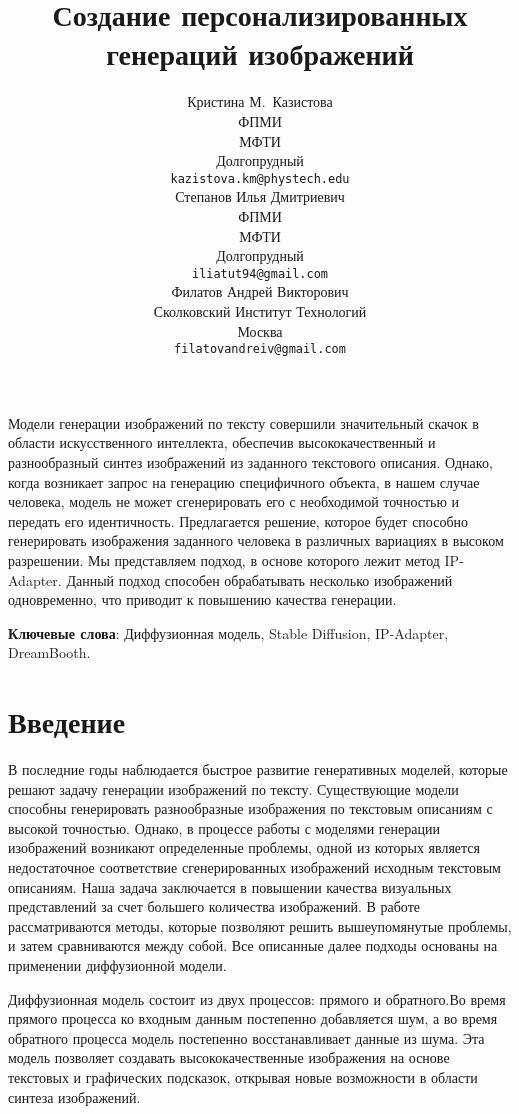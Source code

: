 \documentclass{article}
\title{Создание персонализированных генераций изображений}
\author{ Кристина М.~Казистова \\
	ФПМИ\\
	МФТИ\\
	Долгопрудный \\
	\texttt{kazistova.km@phystech.edu} \\
	\And
	Степанов Илья Дмитриевич \\
	ФПМИ\\
	МФТИ\\
	Долгопрудный \\
	\texttt{iliatut94@gmail.com} \\
    \And
	Филатов Андрей Викторович \\
	Сколковский Институт Технологий\\
	Москва \\
	\texttt{filatovandreiv@gmail.com} \\
}
\date{}
\begin{document}
\maketitle

\begin{Аннотация}
        Модели генерации изображений по тексту совершили значительный скачок в области искусственного интеллекта, обеспечив высококачественный и разнообразный синтез изображений из заданного текстового описания. Однако, когда возникает запрос на генерацию специфичного объекта, в нашем случае человека, модель не может сгенерировать его с необходимой точностью и передать его идентичность. Предлагается решение, которое будет способно генерировать изображения заданного человека в различных вариациях в высоком разрешении. Мы представляем подход, в основе которого лежит метод IP-Adapter. Данный подход способен обрабатывать несколько изображений одновременно, что приводит к повышению качества генерации.
\end{Аннотация}

\textbf{Ключевые слова}: Диффузионная модель, Stable Diffusion\cite{2}, IP-Adapter\cite{1}, DreamBooth\cite{3}.

\section{Введение}В последние годы наблюдается быстрое развитие генеративных моделей, которые решают задачу генерации изображений по тексту. Существующие модели способны генерировать разнообразные изображения по текстовым описаниям с высокой точностью. Однако, в процессе работы с моделями генерации изображений возникают определенные проблемы, одной из которых является недостаточное соответствие сгенерированных изображений исходным текстовым описаниям. Наша задача заключается в повышении качества визуальных представлений за счет большего количества изображений. В работе рассматриваются методы, которые позволяют решить вышеупомянутые проблемы, и затем сравниваются между собой. Все описанные далее подходы основаны на применении диффузионной модели\cite{2}. 

Диффузионная модель состоит из двух процессов: прямого и обратного.Во время прямого процесса ко входным данным постепенно добавляется шум, а во время обратного процесса модель постепенно восстанавливает данные из шума. Эта модель позволяет создавать высококачественные изображения на основе текстовых и графических подсказок, открывая новые возможности в области синтеза изображений.
\end{document}
